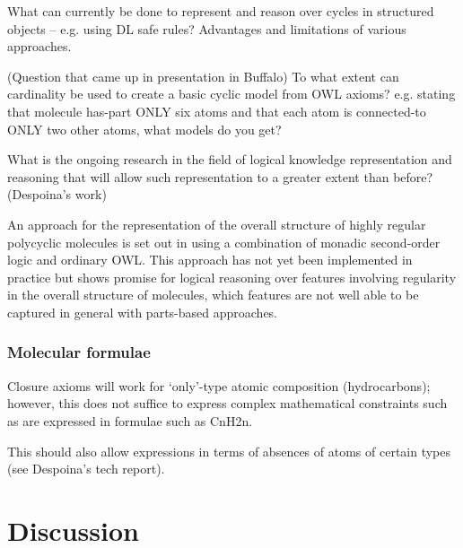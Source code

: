 \documentclass[10pt]{bmc_article}
\newenvironment{bmcformat}{\baselineskip20pt\sloppy\setboolean{publ}{false}}{\baselineskip20pt\sloppy}
\begin{document}
\begin{bmcformat}
What can currently be done to represent and reason over cycles in structured objects -- e.g. using DL safe rules? Advantages and limitations of various approaches. 

(Question that came up in presentation in Buffalo) To what extent can cardinality be used to create a basic cyclic model from OWL axioms?  e.g. stating that molecule has-part ONLY six atoms and that each atom is connected-to ONLY two other atoms, what models do you get? 
 

What is the ongoing research in the field of logical knowledge representation and reasoning that will allow such representation to a greater extent than before?  (Despoina's work)
 
An approach for the representation of the overall structure of highly regular polycyclic molecules is set out in \cite{hastings2011} using a combination of monadic second-order logic and ordinary OWL.  This approach has not yet been implemented in practice but shows promise for logical reasoning over features involving regularity in the overall structure of molecules, which features are not well able to be captured in general with parts-based approaches. 
  

\subsubsection*{Molecular formulae}

Closure axioms will work for `only'-type atomic composition (hydrocarbons); however, this does not suffice to express complex mathematical constraints such as are expressed in formulae such as CnH2n. 

This should also allow expressions in terms of absences of atoms of certain types (see Despoina's tech report). 



\section*{Discussion}




\end{bmcformat}
\end{document}
